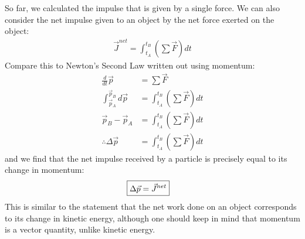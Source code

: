 So far, we calculated the impulse that is given by a single force. We can also consider the net impulse given to an object by the net force exerted on the object:
\begin{align*}
\vec J^{net} = \int_{t_A}^{t_B}\left(\sum\vec F\right) dt
\end{align*}
Compare this to Newton's Second Law written out using momentum:
\begin{align*}
\frac{d}{dt}\vec p &= \sum \vec F\\
\int_{\vec p_A}^{\vec p_B} d\vec p &=  \int_{t_A}^{t_B}\left(\sum\vec F\right) dt\\
\vec p_B - \vec p_A &=  \int_{t_A}^{t_B}\left(\sum\vec F\right) dt\\
\therefore \Delta \vec p &= \int_{t_A}^{t_B}\left(\sum\vec F\right) dt
\end{align*}
and we find that the net impulse received by a particle is precisely equal to its change in momentum:
\begin{align}
\Aboxed{\Delta \vec p = \vec J^{net}}
\end{align}
This is similar to the statement that the net work done on an object corresponds to its change in kinetic energy, although one should keep in mind that momentum is a vector quantity, unlike kinetic energy.

